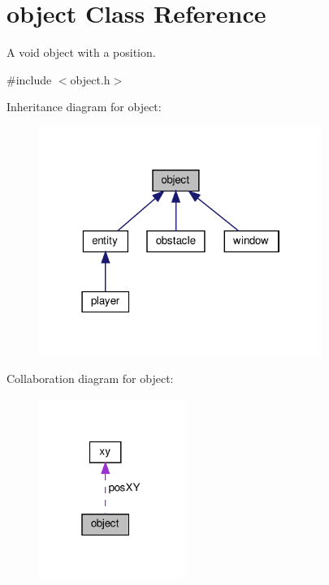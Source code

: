 \hypertarget{classobject}{}\section{object Class Reference}
\label{classobject}


A void object with a position.  




{\ttfamily \#include $<$object.\+h$>$}



Inheritance diagram for object\+:
\nopagebreak
\begin{figure}[H]
\begin{center}
\leavevmode
\includegraphics[width=262pt]{classobject__inherit__graph}
\end{center}
\end{figure}


Collaboration diagram for object\+:
\nopagebreak
\begin{figure}[H]
\begin{center}
\leavevmode
\includegraphics[width=135pt]{classobject__coll__graph}
\end{center}
\end{figure}
